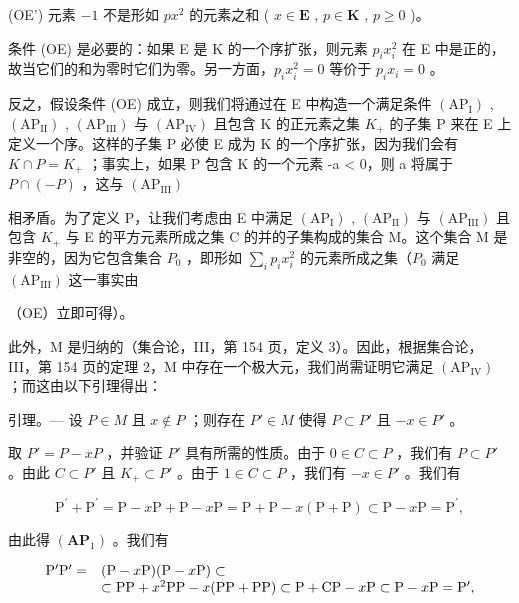 (OE') 元素 \(-1\) 不是形如 \(px^2\) 的元素之和 ( \(x \in \mathbf{E}\) , \(p \in \mathbf{K}\) , \(p \geqslant 0\) )。

条件 (OE) 是必要的：如果 E 是 K 的一个序扩张，则元素 \(p_{i}x_{i}^{2}\) 在 E 中是正的，故当它们的和为零时它们为零。另一方面，\(p_{i}x_{i}^{2}=0\) 等价于 \(p_{i}x_{i}=0\) 。

反之，假设条件 (OE) 成立，则我们将通过在 E 中构造一个满足条件 \((\mathrm{AP}_{\mathrm{I}})\) , \((\mathrm{AP}_{\mathrm{II}})\) , \((\mathrm{AP}_{\mathrm{III}})\) 与 \((\mathrm{AP}_{\mathrm{IV}})\) 且包含 K 的正元素之集 \(K_{+}\) 的子集 P 来在 E 上定义一个序。这样的子集 P 必使 E 成为 K 的一个序扩张，因为我们会有 \(K \cap P = K_{+}\) ；事实上，如果 P 包含 K 的一个元素 -a \textless{} 0，则 a 将属于 \(P \cap (-P)\) ，这与 \((\mathrm{AP}_{\mathrm{III}})\)

相矛盾。为了定义 P，让我们考虑由 E 中满足 \((\mathrm{AP}_{\mathrm{I}})\) , \((\mathrm{AP}_{\mathrm{II}})\) 与 \((\mathrm{AP}_{\mathrm{III}})\) 且包含 \(K_{+}\) 与 E 的平方元素所成之集 C 的并的子集构成的集合 M。这个集合 M 是非空的，因为它包含集合 \(P_{0}\) ，即形如 \(\sum_{i} p_{i} x_{i}^{2}\) 的元素所成之集（\(P_{0}\) 满足 \((\mathrm{AP}_{\mathrm{III}})\) 这一事实由

（OE）立即可得）。

此外，M 是归纳的（集合论，III，第 154 页，定义 3）。因此，根据集合论，III，第 154 页的定理 2，M 中存在一个极大元，我们尚需证明它满足 \((\mathrm{AP}_{\mathrm{IV}})\) ；而这由以下引理得出：

引理。--- 设 \(P \in M\) 且 \(x \notin P\) ；则存在 \(P' \in M\) 使得 \(P \subset P'\) 且 \(-x \in P'\) 。

取 \(P' = P - xP\) ，并验证 \(P'\) 具有所需的性质。由于 \(0 \in C \subset P\) ，我们有 \(P \subset P'\) 。由此 \(C \subset P'\) 且 \(K_{+} \subset P'\) 。由于 \(1 \in C \subset P\) ，我们有 \(-x \in P'\) 。我们有

\[
\mathrm{P} ^ {\prime} + \mathrm{P} ^ {\prime} = \mathrm{P} - x \mathrm{P} + \mathrm{P} - x \mathrm{P} = \mathrm{P} + \mathrm{P} - x (\mathrm{P} + \mathrm{P}) \subset \mathrm{P} - x \mathrm{P} = \mathrm{P} ^ {\prime},
\]

由此得 \((\mathbf{AP}_1)\) 。我们有

\[
\begin{array}{r l} \mathrm {P^ {\prime} P^ {\prime}} = & (\mathrm{P} - x \mathrm{P}) (\mathrm{P} - x \mathrm{P}) \subset \\ & \subset \mathrm{PP} + x ^ {2} \mathrm{PP} - x (\mathrm{PP} + \mathrm{PP}) \subset \mathrm{P} + \mathrm{CP} - x \mathrm{P} \subset \mathrm{P} - x \mathrm{P} = \mathrm {P^ {\prime}}, \end{array}
\]


